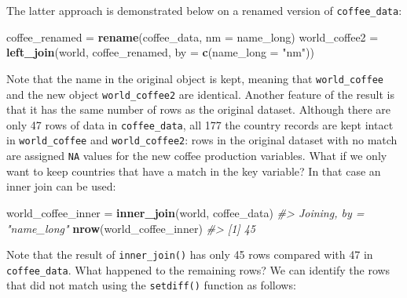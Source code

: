 \documentclass[]{krantz}
\newenvironment{Shaded}{\begin{snugshade}}{\end{snugshade}}
\newcommand{\CommentTok}[1]{\textcolor[rgb]{0.37,0.37,0.37}{\textit{#1}}}
\newcommand{\DataTypeTok}[1]{\textcolor[rgb]{0.27,0.27,0.27}{#1}}
\newcommand{\KeywordTok}[1]{\textcolor[rgb]{0.27,0.27,0.27}{\textbf{#1}}}
\newcommand{\NormalTok}[1]{#1}
\newcommand{\OperatorTok}[1]{\textcolor[rgb]{0.43,0.43,0.43}{\textbf{#1}}}
\newcommand{\StringTok}[1]{\textcolor[rgb]{0.5,0.5,0.5}{#1}}
\begin{document}
The latter approach is demonstrated below on a renamed version of \texttt{coffee\_data}:

\begin{Shaded}
\begin{Highlighting}[]
\NormalTok{coffee_renamed =}\StringTok{ }\KeywordTok{rename}\NormalTok{(coffee_data, }\DataTypeTok{nm =}\NormalTok{ name_long)}
\NormalTok{world_coffee2 =}\StringTok{ }\KeywordTok{left_join}\NormalTok{(world, coffee_renamed, }\DataTypeTok{by =} \KeywordTok{c}\NormalTok{(}\DataTypeTok{name_long =} \StringTok{"nm"}\NormalTok{))}
\end{Highlighting}
\end{Shaded}

Note that the name in the original object is kept, meaning that \texttt{world\_coffee} and the new object \texttt{world\_coffee2} are identical.
Another feature of the result is that it has the same number of rows as the original dataset.
Although there are only 47 rows of data in \texttt{coffee\_data}, all 177 the country records are kept intact in \texttt{world\_coffee} and \texttt{world\_coffee2}:
rows in the original dataset with no match are assigned \texttt{NA} values for the new coffee production variables.
What if we only want to keep countries that have a match in the key variable?
In that case an inner join can be used:

\begin{Shaded}
\begin{Highlighting}[]
\NormalTok{world_coffee_inner =}\StringTok{ }\KeywordTok{inner_join}\NormalTok{(world, coffee_data)}
\CommentTok{#> Joining, by = "name_long"}
\KeywordTok{nrow}\NormalTok{(world_coffee_inner)}
\CommentTok{#> [1] 45}
\end{Highlighting}
\end{Shaded}

Note that the result of \texttt{inner\_join()} has only 45 rows compared with 47 in \texttt{coffee\_data}.
What happened to the remaining rows?
We can identify the rows that did not match using the \texttt{setdiff()} function as follows:

\begin{Shaded}
\end{Shaded}
\end{document}
